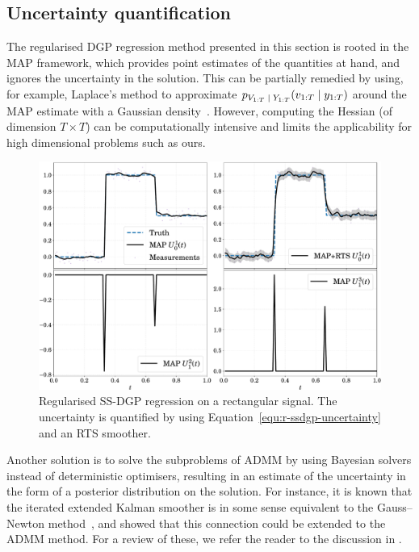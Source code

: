 \subsection*{Uncertainty quantification}
The regularised DGP regression method presented in this section is rooted in the MAP framework, which provides point estimates of the quantities at hand, and ignores the uncertainty in the solution. This can be partially remedied by using, for example, Laplace's method to approximate $p_{V_{1:T} {\;|\;} Y_{1:T}}(v_{1:T} {\;|\;} y_{1:T})$ around the MAP estimate with a Gaussian density~\citep{Bishop2006}. However, computing the Hessian (of dimension $T \times T$) can be computationally intensive and limits the applicability for high dimensional problems such as ours. 

\begin{figure}[t!]
	\centering
	\includegraphics[width=.8\linewidth]{figs/r-ssgp-admm}
	\caption{Regularised SS-DGP regression on a rectangular signal. The uncertainty is quantified by using Equation~\eqref{equ:r-ssdgp-uncertainty} and an RTS smoother.}
	\label{fig:r-ssdgp-admm}
\end{figure}

Another solution is to solve the subproblems of ADMM by using Bayesian solvers instead of deterministic optimisers, resulting in an estimate of the uncertainty in the form of a posterior distribution on the solution. For instance, it is known that the iterated extended Kalman smoother is in some sense equivalent to the Gauss--Newton method~\citep{Bell1994, Simo2020IEKFS}, and \citet{Rui2019ieks} showed that this connection could be extended to the ADMM method. For a review of these, we refer the reader to the discussion in \citet{Rui2020thesis}.

